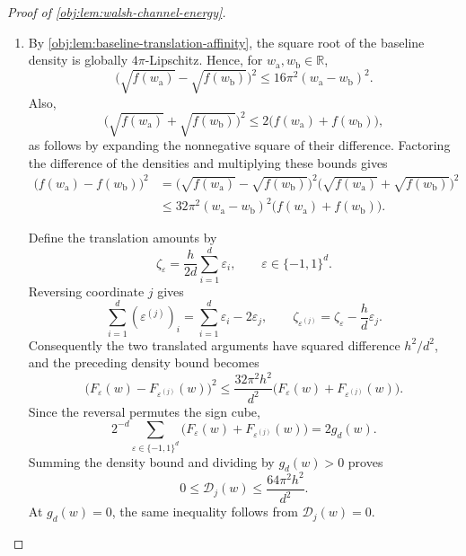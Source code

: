 \begin{proof}[Proof of \cref{obj:lem:walsh-channel-energy}]
\begin{enumerate}
For \(g_d(w)>0\), apply this identity with
\[
v_{\mathrm{cube}}(\varepsilon)=\frac{F_\varepsilon(w)}{g_d(w)}.
\]
Its subset coefficients are \(a_{|E|}(w)\). Grouping subsets by cardinality and multiplying by \(g_d(w)\) gives
\[
\sum_{s=0}^d s\binom ds a_s(w)^2g_d(w)
=
\frac14\sum_{j=1}^d\mathcal D_j(w).
\]
At \(g_d(w)=0\), both sides vanish by their conventions, so this identity holds for every \(w\).

The coefficient densities are integrable: the triangle inequality gives, at positive \(g_d(w)\),
\[
|a_s(w)|
\le
2^{-d}\sum_{\varepsilon\in\{-1,1\}^d}
\frac{F_\varepsilon(w)}{g_d(w)}
=1,
\]
and the zero-density convention preserves this bound. Thus
\[
0\le a_s(w)^2g_d(w)\le g_d(w),
\qquad
\int_{\mathbb R}g_d(w)\,dw=1.
\]
The flip energies are integrable by the bounded compact-support envelope established in the next step. Integrating the pointwise identity and discarding its zero \(s=0\) term therefore gives
\[
\eta_1=\frac14\sum_{j=1}^d\int_{\mathbb R}\mathcal D_j(w)\,dw.
\]

\item By \cref{obj:lem:baseline-translation-affinity}, the square root of the baseline density is globally \(4\pi\)-Lipschitz. Hence, for \(w_{\mathrm a},w_{\mathrm b}\in\mathbb R\),
\[
\bigl(\sqrt{f(w_{\mathrm a})}-\sqrt{f(w_{\mathrm b})}\bigr)^2
\le16\pi^2(w_{\mathrm a}-w_{\mathrm b})^2.
\]
Also,
\[
\bigl(\sqrt{f(w_{\mathrm a})}+\sqrt{f(w_{\mathrm b})}\bigr)^2
\le2\bigl(f(w_{\mathrm a})+f(w_{\mathrm b})\bigr),
\]
as follows by expanding the nonnegative square of their difference. Factoring the difference of the densities and multiplying these bounds gives
\[
\begin{aligned}
\bigl(f(w_{\mathrm a})-f(w_{\mathrm b})\bigr)^2
&=
\bigl(\sqrt{f(w_{\mathrm a})}-\sqrt{f(w_{\mathrm b})}\bigr)^2
\bigl(\sqrt{f(w_{\mathrm a})}+\sqrt{f(w_{\mathrm b})}\bigr)^2\\
&\le
32\pi^2(w_{\mathrm a}-w_{\mathrm b})^2
\bigl(f(w_{\mathrm a})+f(w_{\mathrm b})\bigr).
\end{aligned}
\]

Define the translation amounts by
\[
\zeta_\varepsilon=\frac{h}{2d}\sum_{i=1}^d\varepsilon_i,
\qquad \varepsilon\in\{-1,1\}^d.
\]
Reversing coordinate \(j\) gives
\[
\sum_{i=1}^d(\varepsilon^{(j)})_i
=\sum_{i=1}^d\varepsilon_i-2\varepsilon_j,
\qquad
\zeta_{\varepsilon^{(j)}}=\zeta_\varepsilon-\frac hd\varepsilon_j.
\]
Consequently the two translated arguments have squared difference \(h^2/d^2\), and the preceding density bound becomes
\[
\bigl(F_\varepsilon(w)-F_{\varepsilon^{(j)}}(w)\bigr)^2
\le
\frac{32\pi^2h^2}{d^2}
\bigl(F_\varepsilon(w)+F_{\varepsilon^{(j)}}(w)\bigr).
\]
Since the reversal permutes the sign cube,
\[
2^{-d}\sum_{\varepsilon\in\{-1,1\}^d}
\bigl(F_\varepsilon(w)+F_{\varepsilon^{(j)}}(w)\bigr)
=2g_d(w).
\]
Summing the density bound and dividing by \(g_d(w)>0\) proves
\[
0\le\mathcal D_j(w)\le\frac{64\pi^2h^2}{d^2}.
\]
At \(g_d(w)=0\), the same inequality follows from \(\mathcal D_j(w)=0\).


\end{enumerate}
\end{proof}
